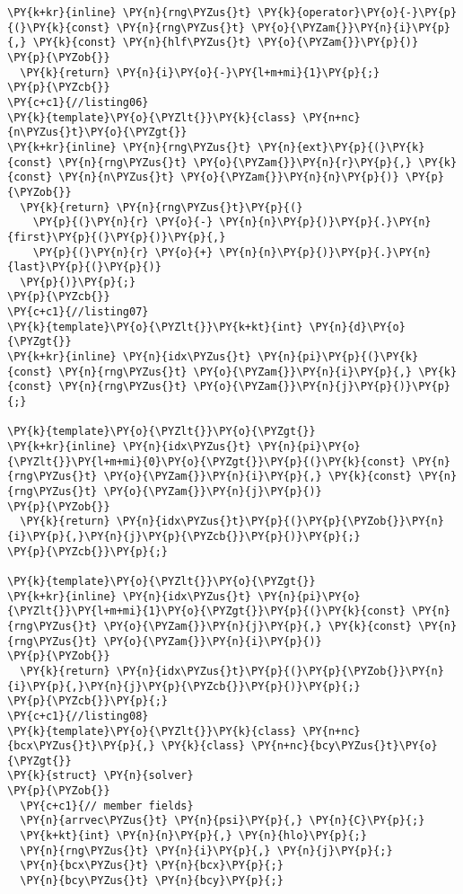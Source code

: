 \begin{Verbatim}[commandchars=\\\{\}]
\PY{k+kr}{inline} \PY{n}{rng\PYZus{}t} \PY{k}{operator}\PY{o}{-}\PY{p}{(}\PY{k}{const} \PY{n}{rng\PYZus{}t} \PY{o}{\PYZam{}}\PY{n}{i}\PY{p}{,} \PY{k}{const} \PY{n}{hlf\PYZus{}t} \PY{o}{\PYZam{}}\PY{p}{)} 
\PY{p}{\PYZob{}} 
  \PY{k}{return} \PY{n}{i}\PY{o}{-}\PY{l+m+mi}{1}\PY{p}{;} 
\PY{p}{\PYZcb{}}
\PY{c+c1}{//listing06}
\PY{k}{template}\PY{o}{\PYZlt{}}\PY{k}{class} \PY{n+nc}{n\PYZus{}t}\PY{o}{\PYZgt{}}
\PY{k+kr}{inline} \PY{n}{rng\PYZus{}t} \PY{n}{ext}\PY{p}{(}\PY{k}{const} \PY{n}{rng\PYZus{}t} \PY{o}{\PYZam{}}\PY{n}{r}\PY{p}{,} \PY{k}{const} \PY{n}{n\PYZus{}t} \PY{o}{\PYZam{}}\PY{n}{n}\PY{p}{)} \PY{p}{\PYZob{}} 
  \PY{k}{return} \PY{n}{rng\PYZus{}t}\PY{p}{(}
    \PY{p}{(}\PY{n}{r} \PY{o}{-} \PY{n}{n}\PY{p}{)}\PY{p}{.}\PY{n}{first}\PY{p}{(}\PY{p}{)}\PY{p}{,} 
    \PY{p}{(}\PY{n}{r} \PY{o}{+} \PY{n}{n}\PY{p}{)}\PY{p}{.}\PY{n}{last}\PY{p}{(}\PY{p}{)}
  \PY{p}{)}\PY{p}{;} 
\PY{p}{\PYZcb{}} 
\PY{c+c1}{//listing07}
\PY{k}{template}\PY{o}{\PYZlt{}}\PY{k+kt}{int} \PY{n}{d}\PY{o}{\PYZgt{}} 
\PY{k+kr}{inline} \PY{n}{idx\PYZus{}t} \PY{n}{pi}\PY{p}{(}\PY{k}{const} \PY{n}{rng\PYZus{}t} \PY{o}{\PYZam{}}\PY{n}{i}\PY{p}{,} \PY{k}{const} \PY{n}{rng\PYZus{}t} \PY{o}{\PYZam{}}\PY{n}{j}\PY{p}{)}\PY{p}{;}

\PY{k}{template}\PY{o}{\PYZlt{}}\PY{o}{\PYZgt{}}
\PY{k+kr}{inline} \PY{n}{idx\PYZus{}t} \PY{n}{pi}\PY{o}{\PYZlt{}}\PY{l+m+mi}{0}\PY{o}{\PYZgt{}}\PY{p}{(}\PY{k}{const} \PY{n}{rng\PYZus{}t} \PY{o}{\PYZam{}}\PY{n}{i}\PY{p}{,} \PY{k}{const} \PY{n}{rng\PYZus{}t} \PY{o}{\PYZam{}}\PY{n}{j}\PY{p}{)} 
\PY{p}{\PYZob{}}
  \PY{k}{return} \PY{n}{idx\PYZus{}t}\PY{p}{(}\PY{p}{\PYZob{}}\PY{n}{i}\PY{p}{,}\PY{n}{j}\PY{p}{\PYZcb{}}\PY{p}{)}\PY{p}{;}
\PY{p}{\PYZcb{}}\PY{p}{;}

\PY{k}{template}\PY{o}{\PYZlt{}}\PY{o}{\PYZgt{}}
\PY{k+kr}{inline} \PY{n}{idx\PYZus{}t} \PY{n}{pi}\PY{o}{\PYZlt{}}\PY{l+m+mi}{1}\PY{o}{\PYZgt{}}\PY{p}{(}\PY{k}{const} \PY{n}{rng\PYZus{}t} \PY{o}{\PYZam{}}\PY{n}{j}\PY{p}{,} \PY{k}{const} \PY{n}{rng\PYZus{}t} \PY{o}{\PYZam{}}\PY{n}{i}\PY{p}{)} 
\PY{p}{\PYZob{}}
  \PY{k}{return} \PY{n}{idx\PYZus{}t}\PY{p}{(}\PY{p}{\PYZob{}}\PY{n}{i}\PY{p}{,}\PY{n}{j}\PY{p}{\PYZcb{}}\PY{p}{)}\PY{p}{;}
\PY{p}{\PYZcb{}}\PY{p}{;} 
\PY{c+c1}{//listing08}
\PY{k}{template}\PY{o}{\PYZlt{}}\PY{k}{class} \PY{n+nc}{bcx\PYZus{}t}\PY{p}{,} \PY{k}{class} \PY{n+nc}{bcy\PYZus{}t}\PY{o}{\PYZgt{}}
\PY{k}{struct} \PY{n}{solver}
\PY{p}{\PYZob{}}
  \PY{c+c1}{// member fields}
  \PY{n}{arrvec\PYZus{}t} \PY{n}{psi}\PY{p}{,} \PY{n}{C}\PY{p}{;}
  \PY{k+kt}{int} \PY{n}{n}\PY{p}{,} \PY{n}{hlo}\PY{p}{;}
  \PY{n}{rng\PYZus{}t} \PY{n}{i}\PY{p}{,} \PY{n}{j}\PY{p}{;}
  \PY{n}{bcx\PYZus{}t} \PY{n}{bcx}\PY{p}{;}
  \PY{n}{bcy\PYZus{}t} \PY{n}{bcy}\PY{p}{;}


\end{Verbatim}
